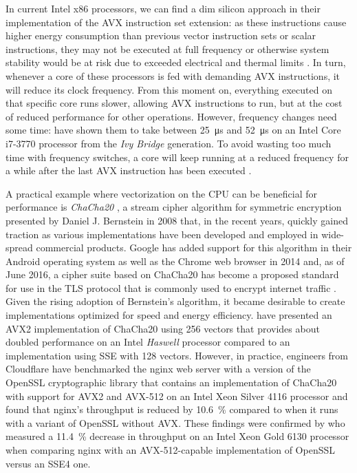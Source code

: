 In current Intel \gls{x86} processors, we can find a dim silicon approach in their implementation of the \gls{AVX} instruction set extension: as these instructions cause higher energy consumption than previous vector instruction sets or scalar instructions, they may not be executed at full frequency or otherwise system stability would be at risk due to exceeded electrical and thermal limits \cite{inteloptimizationmanual}. In turn, whenever a core of these processors is fed with demanding \gls{AVX} instructions, it will reduce its clock frequency. From this moment on, everything executed on that specific core runs slower, allowing \gls{AVX} instructions to run, but at the cost of reduced performance for other operations. However, frequency changes need some time: \citeauthor{mazouz2014evaluation} \cite{mazouz2014evaluation} have shown them to take between \SI{25}{\micro\second} and \SI{52}{\micro\second} on an Intel Core i7-3770 processor from the \textit{Ivy Bridge} generation. To avoid wasting too much time with frequency switches, a core will keep running at a reduced frequency for a while after the last \gls{AVX} instruction has been executed \cite{inteloptimizationmanual}.

A practical example where vectorization on the \gls{CPU} can be beneficial for performance is \emph{ChaCha20} \cite{bernstein2008chacha}, a stream cipher algorithm for symmetric encryption presented by Daniel J. Bernstein in 2008 that, in the recent years, quickly gained traction as various implementations have been developed and employed in wide-spread commercial products. Google has added support for this algorithm in their Android operating system as well as the Chrome web browser in 2014 \cite{googlechacha20} and, as of June 2016, a cipher suite based on ChaCha20 has become a proposed standard for use in the \gls{TLS} protocol that is commonly used to encrypt internet traffic \cite{rfc7905}. Given the rising adoption of Bernstein's algorithm, it became desirable to create implementations optimized for speed and energy efficiency. \citeauthor{goll2014vectorization} \cite{goll2014vectorization} have presented an \gls{AVX2} implementation of ChaCha20 using \SI[number-unit-product=-]{256}{\bit} vectors that provides about doubled performance on an Intel \textit{Haswell} processor compared to an implementation using \gls{SSE} with \SI[number-unit-product=-]{128}{\bit} vectors. However, in practice, engineers from Cloudflare \cite{cloudflareinteldangers} have benchmarked the nginx web server with a version of the OpenSSL cryptographic library that contains an implementation of ChaCha20 with support for \gls{AVX2} and \gls{AVX-512} on an Intel Xeon Silver 4116 processor and found that nginx's throughput is reduced by \SI{10.6}{\percent} compared to when it runs with a variant of OpenSSL without \gls{AVX}. These findings were confirmed by \citeauthor{gottschlag19sfma} \cite{gottschlag19sfma} who measured a \SI{11.4}{\percent} decrease in throughput on an Intel Xeon Gold 6130 processor when comparing nginx with an \gls{AVX-512}-capable implementation of OpenSSL versus an \gls{SSE}4 one.

